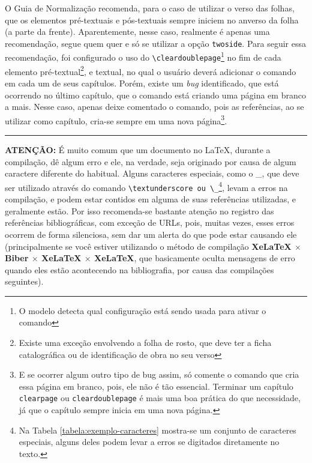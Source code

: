 O Guia de Normalização recomenda, para o caso de utilizar o verso das folhas, que os elementos pré-textuais e pós-textuais sempre iniciem no anverso da folha (a parte da frente). Aparentemente, nesse caso, realmente é apenas uma recomendação, segue quem quer e só se utilizar a opção \texttt{twoside}. Para seguir essa recomendação, foi configurado o uso do \verb|\cleardoublepage|\footnote{O modelo detecta qual configuração está sendo usada para ativar o comando} no fim de cada elemento pré-textual\footnote{Existe uma exceção envolvendo a folha de rosto, que deve ter a ficha catalográfica ou de identificação de obra no seu verso}, e textual, no qual o usuário deverá adicionar o comando em cada um de seus capítulos. Porém, existe um \textit{bug} identificado, que está ocorrendo no último capítulo, que o comando está criando uma página em branco a mais. Nesse caso, apenas deixe comentado o comando, pois as referências, ao se utilizar como capítulo, cria-se sempre em uma nova página\footnote{E se ocorrer algum outro tipo de bug assim, só comente o comando que cria essa página em branco, pois, ele não é tão essencial. Terminar um capítulo \texttt{clearpage} ou \texttt{cleardoublepage} é mais uma boa prática do que necessidade, já que o capítulo sempre inicia em uma nova página.}.


\vspace{\baselineskip}
\begin{Center}
    \rule{12cm}{1pt}
\end{Center}

\textbf{ATENÇÃO:} É muito comum que um documento no \LaTeX, durante a compilação, dê algum erro e ele, na verdade, seja originado por causa de algum caractere diferente do habitual. Alguns caracteres especiais, como o \_, que deve ser utilizado através do comando \verb|\textunderscore ou \_|\footnote{Na Tabela \ref{tabela:exemplo-caracteres} mostra-se um conjunto de caracteres especiais, alguns deles podem levar a erros se digitados diretamente no texto.}, levam a erros na compilação, e podem estar contidos em alguma de suas referências utilizadas, e geralmente estão. Por isso recomenda-se bastante atenção no registro das referências bibliográficas, com exceção de URLs, pois, muitas vezes, esses erros ocorrem de forma silenciosa, sem dar um alerta do que pode estar causando ele (principalmente se você estiver utilizando o método de compilação \textbf{XeLaTeX $\times$ Biber $\times$ XeLaTeX $\times$ XeLaTeX}, que basicamente oculta mensagens de erro quando eles estão acontecendo na bibliografia, por causa das compilações seguintes).
